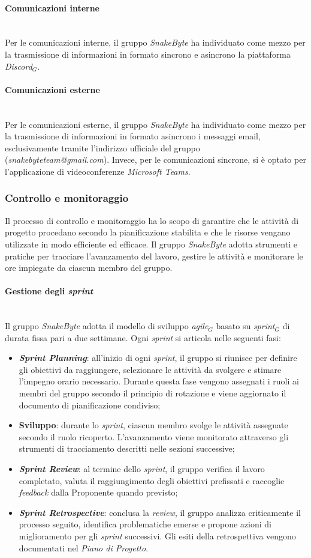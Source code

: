 \documentclass[10pt, letterpaper]{article}
\newcommand{\trisubsection}[1]{\paragraph{#1}\mbox{}\\}
\begin{document}
\trisubsection{Comunicazioni interne}
Per le comunicazioni interne, il gruppo \textit{SnakeByte} ha individuato come mezzo per la trasmissione di informazioni in formato sincrono e asincrono la piattaforma \textit{Discord$_{G}$}.

\trisubsection{Comunicazioni esterne}
Per le comunicazioni esterne, il gruppo \textit{SnakeByte} ha individuato come mezzo per la trasmissione di informazioni in formato asincrono i messaggi email, esclusivamente tramite l'indirizzo ufficiale del gruppo (\textit{snakebyteteam@gmail.com}). Invece, per le comunicazioni sincrone, si è optato per l'applicazione di videoconferenze \textit{Microsoft Teams}.

\subsubsection{Controllo e monitoraggio}
Il processo di controllo e monitoraggio ha lo scopo di garantire che le attività di progetto procedano secondo la pianificazione stabilita e che le risorse vengano utilizzate in modo efficiente ed efficace. Il gruppo \textit{SnakeByte} adotta strumenti e pratiche per tracciare l'avanzamento del lavoro, gestire le attività e monitorare le ore impiegate da ciascun membro del gruppo.

\trisubsection{Gestione degli \textit{sprint}}
Il gruppo \textit{SnakeByte} adotta il modello di sviluppo \textit{agile$_G$} basato su \textit{sprint$_{G}$} di durata fissa pari a due settimane. Ogni \textit{sprint} si articola nelle seguenti fasi:

\begin{itemize}
    \item \textbf{\textit{Sprint Planning}}: all'inizio di ogni \textit{sprint}, il gruppo si riunisce per definire gli obiettivi da raggiungere, selezionare le attività da svolgere e stimare l'impegno orario necessario. Durante questa fase vengono assegnati i ruoli ai membri del gruppo secondo il principio di rotazione e viene aggiornato il documento di pianificazione condiviso;

    \item \textbf{Sviluppo}: durante lo \textit{sprint}, ciascun membro svolge le attività assegnate secondo il ruolo ricoperto. L'avanzamento viene monitorato attraverso gli strumenti di tracciamento descritti nelle sezioni successive;

    \item \textbf{\textit{Sprint Review}}: al termine dello \textit{sprint}, il gruppo verifica il lavoro completato, valuta il raggiungimento degli obiettivi prefissati e raccoglie \textit{feedback} dalla Proponente quando previsto;

    \item \textbf{\textit{Sprint Retrospective}}: conclusa la \textit{review}, il gruppo analizza criticamente il processo seguito, identifica problematiche emerse e propone azioni di miglioramento per gli \textit{sprint} successivi. Gli esiti della retrospettiva vengono documentati nel \textit{Piano di Progetto}.
\end{itemize}
\end{document}
